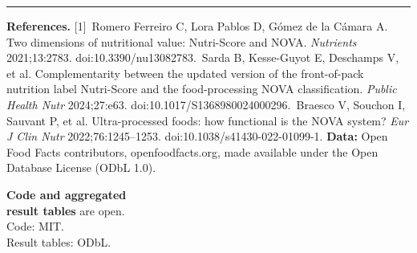 \documentclass{article}
\newcommand{\Tiny}{\fontsize{12.5}{16}\selectfont\color{ink2}}
\begin{document}
\vfill
{\color{rule}\rule{\textwidth}{1.2pt}}\vspace{5pt}
\begin{minipage}[t]{0.80\textwidth}\vspace{0pt}
{\Tiny\textbf{\color{ink}References.}
[1]~Romero Ferreiro C, Lora Pablos D, Gómez de la Cámara A. Two dimensions of nutritional value: Nutri-Score and NOVA. \emph{Nutrients} 2021;13:2783. \mbox{doi:10.3390/nu13082783}.\;
[2]~Sarda B, Kesse-Guyot E, Deschamps V, et al. Complementarity between the updated version of the front-of-pack nutrition label Nutri-Score and the food-processing NOVA classification. \emph{Public Health Nutr} 2024;27:e63. \mbox{doi:10.1017/S1368980024000296}.\;
[3]~Braesco V, Souchon I, Sauvant P, et al. Ultra-processed foods: how functional is the NOVA system? \emph{Eur J Clin Nutr} 2022;76:1245--1253. \mbox{doi:10.1038/s41430-022-01099-1}.\;
\textbf{\color{ink}Data:} Open Food Facts contributors, openfoodfacts.org, made available under the Open Database License (ODbL 1.0).\par}
\end{minipage}\hfill
\begin{minipage}[t]{0.18\textwidth}\vspace{0pt}\raggedleft
{\Tiny\textbf{\color{ink}Code and aggregated}\\ \textbf{\color{ink}result tables} are open.\\ Code: MIT.\\ Result tables: ODbL.\par}
\end{minipage}
\end{document}
